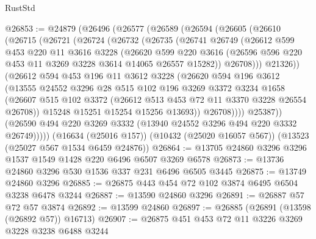 \begin{lexlean}{RustStd}
\begin{coremodule}
@26853 := @24879
    (@26496
      (@26577
        (@26589
          (@26594
            (@26605
              (@26610
                (@26715
                  (@26721
                    (@26724
                      (@26732
                        (@26735
                          (@26741
                            @26749
                            (@26612
                              @599
                              @453
                              @220
                              @11
                              @3616
                              @3228
                              (@26620
                                @599
                                @220
                                @3616
                                (@26596 @596 @220 @453 @11 @3269 @3228 @3614 @14065 @26557 @15282))
                              @26708)))
                        @21326))
                    (@26612
                      @594
                      @453
                      @196
                      @11
                      @3612
                      @3228
                      (@26620
                        @594
                        @196
                        @3612
                        (@13555
                          @24552
                          @3296
                          @28
                          @515
                          @102
                          @196
                          @3269
                          @3372
                          @3234
                          @1658
                          (@26607
                            @515
                            @102
                            @3372
                            (@26612 @513 @453 @72 @11 @3370 @3228 @26554 @26708))
                          @15248
                          @15251
                          @15254
                          @15256
                          @13693))
                      @26708))))
              @25387))
          (@26590 @494 @220 @3269 @3332 (@13940 @24552 @3296 @494 @220 @3332 @26749)))))
    (@16634 (@25016 @157))
    (@10432 (@25020 @16057 @567))
    (@13523 (@25027 @567 @1534 @6459 @24876))
@26864 := @13705 @24860 @3296 @3296 @1537 @1549 @1428 @220 @6496 @6507 @3269 @6578
@26873 := @13736 @24860 @3296 @530 @1536 @337 @231 @6496 @6505 @3445
@26875 := @13749 @24860 @3296
@26885 := @26875 @443 @454 @72 @102 @3874 @6495 @6504 @3238 @6478 @3244
@26887 := @13590 @24860 @3296
@26891 := @26887 @57 @72 @57 @3874
@26892 := @13599 @24860
@26897 := @26885 (@26891 (@13598 (@26892 @57)) @16713)
@26907 := @26875 @451 @453 @72 @11 @3226 @3269 @3228 @3238 @6488 @3244

\end{coremodule}
\end{lexlean}
